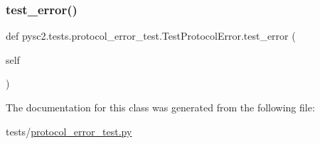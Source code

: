 \subsubsection{\texorpdfstring{test\+\_\+error()}{test\_error()}}
{\footnotesize\ttfamily def pysc2.\+tests.\+protocol\+\_\+error\+\_\+test.\+Test\+Protocol\+Error.\+test\+\_\+error (\begin{DoxyParamCaption}\item[{}]{self }\end{DoxyParamCaption})}



The documentation for this class was generated from the following file\+:\begin{DoxyCompactItemize}
\item 
tests/\mbox{\hyperlink{protocol__error__test_8py}{protocol\+\_\+error\+\_\+test.\+py}}\end{DoxyCompactItemize}
